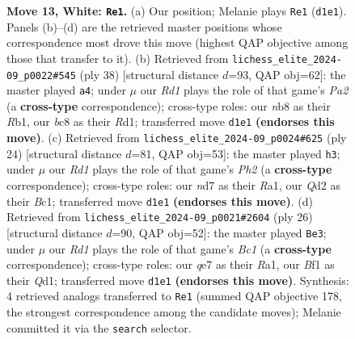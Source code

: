 \documentclass[11pt]{article}
\begin{document}
\begin{figure}[p]
\caption{\textbf{Move 13, White: \texttt{Re1}.} (a) Our position; Melanie plays \texttt{Re1} (\texttt{d1e1}). Panels (b)--(d) are the retrieved master positions whose correspondence most drove this move (highest QAP objective among those that transfer to it). (b) Retrieved from \texttt{lichess\_elite\_2024-09\_p0022\#545} (ply 38) [structural distance $d$=93, QAP obj=62]: the master played \texttt{a4}; under $\mu$ our \emph{Rd1} plays the role of that game's \emph{Pa2} (a \textbf{cross-type} correspondence); cross-type roles: our \emph{n}b8 as their \emph{R}b1, our \emph{b}c8 as their \emph{R}d1; transferred move \texttt{d1e1} \textbf{(endorses this move)}. (c) Retrieved from \texttt{lichess\_elite\_2024-09\_p0024\#625} (ply 24) [structural distance $d$=81, QAP obj=53]: the master played \texttt{h3}; under $\mu$ our \emph{Rd1} plays the role of that game's \emph{Ph2} (a \textbf{cross-type} correspondence); cross-type roles: our \emph{n}d7 as their \emph{R}a1, our \emph{Q}d2 as their \emph{B}c1; transferred move \texttt{d1e1} \textbf{(endorses this move)}. (d) Retrieved from \texttt{lichess\_elite\_2024-09\_p0021\#2604} (ply 26) [structural distance $d$=90, QAP obj=52]: the master played \texttt{Be3}; under $\mu$ our \emph{Rd1} plays the role of that game's \emph{Bc1} (a \textbf{cross-type} correspondence); cross-type roles: our \emph{q}e7 as their \emph{R}a1, our \emph{B}f1 as their \emph{Q}d1; transferred move \texttt{d1e1} \textbf{(endorses this move)}. Synthesis: 4 retrieved analogs transferred to \texttt{Re1} (summed QAP objective 178, the strongest correspondence among the candidate moves); Melanie committed it via the \texttt{search} selector.}
\label{fig:thought-m24}
\end{figure}

\clearpage
\end{document}
